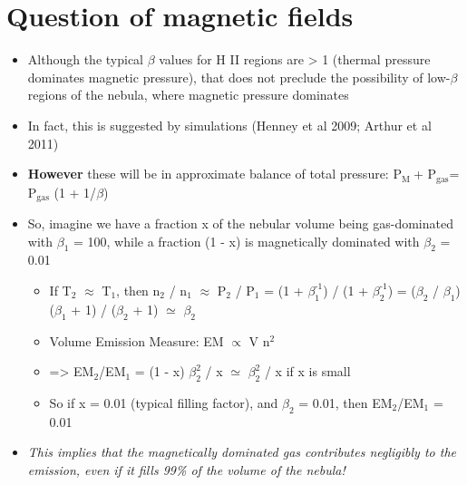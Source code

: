 \documentclass[11pt]{article}
\begin{document}
\section{Question of magnetic fields}
\label{sec:orgheadline2}
\begin{itemize}
\item Although the typical \(\beta\) values for H II regions are > 1 (thermal pressure dominates magnetic pressure), that does not preclude the possibility of low-\(\beta\) regions of the nebula, where magnetic pressure dominates
\item In fact, this is suggested by simulations (Henney et al 2009; Arthur et al 2011)
\item \textbf{However} these will be in approximate balance of total pressure: P\(_{\text{M }}\)+ P\(_{\text{gas}}\)= P\(_{\text{gas}}\) (1 + 1/\(\beta\))
\item So, imagine we have a fraction x of the nebular volume being gas-dominated with \(\beta_{\text{1}}\) = 100, while a fraction (1 - x) is magnetically dominated with \(\beta_{\text{2}}\) = 0.01
\begin{itemize}
\item If T\(_{\text{2}}\) \(\approx\) T\(_{\text{1}}\), then n\(_{\text{2}}\) / n\(_{\text{1}}\) \(\approx\) P\(_{\text{2}}\) / P\(_{\text{1}}\)  = (1 + \(\beta_{\text{1}}^{\text{-1}}\)) / (1 + \(\beta_{\text{2}}^{\text{-1}}\)) = (\(\beta_{\text{2}}\) / \(\beta_{\text{1}}\)) (\(\beta_{\text{1}}\) + 1) / (\(\beta_{\text{2}}\) + 1) \(\simeq\) \(\beta_{\text{2}}\)
\item Volume Emission Measure: EM \(\propto\) V n\(^{\text{2}}\)
\item => EM\(_{\text{2}}\)/EM\(_{\text{1}}\) = (1 - x) \(\beta_{\text{2}}^{\text{2}}\) / x \(\simeq\) \(\beta_{\text{2}}^{\text{2}}\) / x if x is small
\item So if x = 0.01 (typical filling factor), and \(\beta_{\text{2}}\) = 0.01, then EM\(_{\text{2}}\)/EM\(_{\text{1}}\) = 0.01
\end{itemize}
\item \emph{This implies that the magnetically dominated gas contributes negligibly to the emission, even if it fills 99\% of the volume of the nebula!}
\end{itemize}
\end{document}
